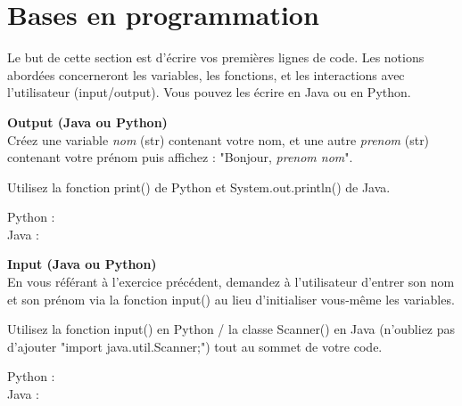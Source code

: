 \newpage
\section{Bases en programmation}
Le but de cette section est d'écrire vos premières lignes de code. Les notions abordées concerneront les variables, les fonctions, et les interactions avec l'utilisateur (input/output). Vous pouvez les écrire en Java ou en Python.\\

\begin{Exercice}[20 minutes] \textbf{Output (Java ou Python)}\\
   Créez une variable \textit{nom} (str) contenant votre nom, et une autre \textit{prenom} (str) contenant votre prénom puis affichez : "Bonjour, \textit{prenom nom}". \\
   
    \begin{conseil}
        Utilisez la fonction print() de Python et System.out.println() de Java. 
        
    \end{conseil}
    \begin{solution}
    
    Python : \\
    
    
    
    Java : \\
    
      
       
        
    \end{solution}   
\end{Exercice}

\begin{Exercice}[20 minutes] \textbf{Input (Java ou Python)}\\
   En vous référant à l'exercice précédent, demandez à l'utilisateur d'entrer son nom et son prénom via la fonction input() au lieu d'initialiser vous-même les variables. \\
   
    \begin{conseil}
       Utilisez la fonction input() en Python / la classe Scanner() en Java (n'oubliez pas d'ajouter "import java.util.Scanner;") tout au sommet de votre code. 
        
    \end{conseil}
    \begin{solution}
    
    Python : \\
    
    
    
    Java : \\
    
      
       
        
    \end{solution}   
\end{Exercice}

